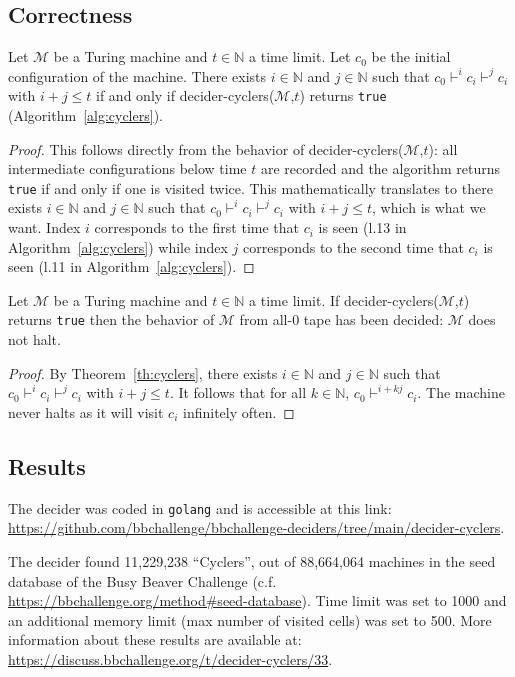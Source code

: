 \subsection{Correctness}



\begin{theorem}\label{th:cyclers}\normalfont Let $\mathcal{M}$ be a Turing machine and $t \in \mathbb{N}$ a time limit. Let $c_0$ be the initial configuration of the machine. There exists $i\in\mathbb{N}$ and $j\in\mathbb{N}$ such that $c_0 \vdash^i c_i \vdash^j c_i$ with $i+j \leq t$ if and only if {\sc decider-cyclers}($\mathcal{M}$,$t$) returns \texttt{true} (Algorithm~\ref{alg:cyclers}).
\end{theorem}
\begin{proof}
  This follows directly from the behavior of {\sc decider-cyclers}($\mathcal{M}$,$t$): all intermediate configurations below time $t$ are recorded and the algorithm returns \texttt{true} if and only if one is visited twice. This mathematically translates to
  there exists $i\in\mathbb{N}$ and $j\in\mathbb{N}$ such that $c_0 \vdash^i c_i \vdash^j c_i$ with $i+j \leq t$, which is what we want. Index $i$ corresponds to the first time that $c_i$ is seen (l.13 in Algorithm~\ref{alg:cyclers}) while index $j$ corresponds to the second time that $c_i$ is seen (l.11 in Algorithm~\ref{alg:cyclers}).
\end{proof}

\begin{corollary}\normalfont
  Let $\mathcal{M}$ be a Turing machine and $t \in \mathbb{N}$ a time limit. If {\sc decider-cyclers}($\mathcal{M}$,$t$) returns \texttt{true} then the behavior of $\mathcal{M}$ from all-0 tape has been decided: $\mathcal{M}$ does not halt.
\end{corollary}
\begin{proof}
  By Theorem~\ref{th:cyclers}, there exists $i\in\mathbb{N}$ and $j\in\mathbb{N}$ such that $c_0 \vdash^i c_i \vdash^j c_i$ with $i+j \leq t$. It follows that for all $k\in\mathbb{N}$, $c_0 \vdash^{i+kj} c_i$. The machine never halts as it will visit $c_i$ infinitely often.
\end{proof}

\subsection{Results}

The decider was coded in \texttt{golang} and is accessible at this link: \url{https://github.com/bbchallenge/bbchallenge-deciders/tree/main/decider-cyclers}.

The decider found 11,229,238 ``Cyclers'', out of 88,664,064 machines in the seed database of the Busy Beaver Challenge (c.f. \url{https://bbchallenge.org/method#seed-database}). Time limit was set to 1000 and an additional memory limit (max number of visited cells) was set to 500. More information about these results are available at: \url{https://discuss.bbchallenge.org/t/decider-cyclers/33}.

